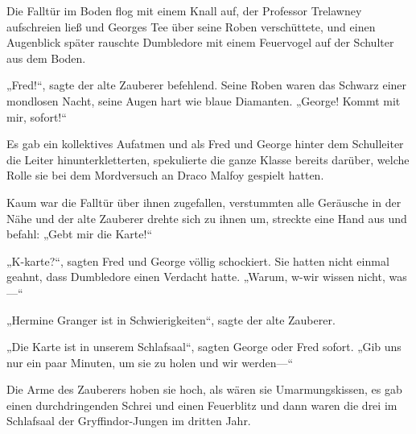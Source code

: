 Die Falltür im Boden flog mit einem Knall auf, der Professor Trelawney aufschreien ließ und Georges Tee über seine Roben verschüttete, und einen Augenblick später rauschte Dumbledore mit einem Feuervogel auf der Schulter aus dem Boden.

„Fred!“, sagte der alte Zauberer befehlend. Seine Roben waren das Schwarz einer mondlosen Nacht, seine Augen hart wie blaue Diamanten. „George! Kommt mit mir, sofort!“

Es gab ein kollektives Aufatmen und als Fred und George hinter dem Schulleiter die Leiter hinunterkletterten, spekulierte die ganze Klasse bereits darüber, welche Rolle sie bei dem Mordversuch an Draco Malfoy gespielt hatten.

Kaum war die Falltür über ihnen zugefallen, verstummten alle Geräusche in der Nähe und der alte Zauberer drehte sich zu ihnen um, streckte eine Hand aus und befahl:
„Gebt mir die Karte!“

„K-karte?“, sagten Fred und George völlig schockiert. Sie hatten nicht einmal geahnt, dass Dumbledore einen Verdacht hatte.
„Warum, w-wir wissen nicht, was—“

„Hermine Granger ist in Schwierigkeiten“, sagte der alte Zauberer.

„Die Karte ist in unserem Schlafsaal“, sagten George oder Fred sofort. „Gib uns nur ein paar Minuten, um sie zu holen und wir werden—“

Die Arme des Zauberers hoben sie hoch, als wären sie Umarmungskissen, es gab einen durchdringenden Schrei und einen Feuerblitz und dann waren die drei im Schlafsaal der Gryffindor-Jungen im dritten Jahr.

